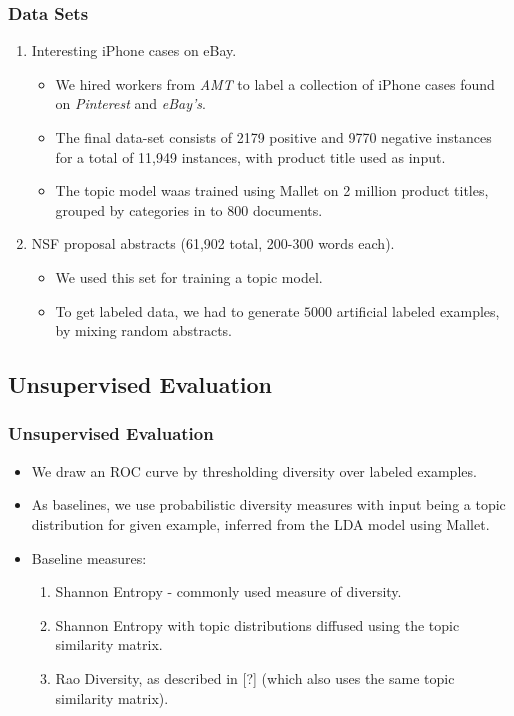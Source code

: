 \documentclass{beamer}
\begin{document}
\begin{frame}
\frametitle{Data Sets}
\begin{enumerate}
\item Interesting iPhone cases on eBay.
  \begin{itemize}
  \item We hired workers from {\em AMT} to label a collection
of iPhone cases found on {\em Pinterest} and {\em
  eBay's}.
\item The final data-set consists of 2179 positive and 9770 negative instances for
a total of 11,949 instances, with product title used as input. 
\item The topic model waas trained using Mallet on 2 million product
  titles, grouped by categories in to 800 documents.
\end{itemize}
\item NSF proposal abstracts (61,902 total, 200-300 words each).
\begin{itemize}
\item We used this set 
for training a topic model.
\item To get labeled data, we had to generate $5000$ artificial
  labeled examples, by mixing random abstracts. 
\end{itemize}
\end{enumerate}
\end{frame}

\subsection{Unsupervised Evaluation}

\begin{frame}
\frametitle{Unsupervised Evaluation}
\begin{itemize}
\item We draw an ROC curve by thresholding diversity
  over labeled examples. 
\item As baselines, we use probabilistic diversity
  measures with input being a topic distribution for  given example,
  inferred from the LDA model using Mallet.
\item Baseline measures:
\begin{enumerate}
\item Shannon Entropy - commonly used measure of diversity.
\item Shannon Entropy with topic distributions diffused using the topic
  similarity matrix. 
\item Rao Diversity, as described in [?] (which also uses the same
  topic similarity matrix). 
\end{enumerate}
\end{itemize}
\end{frame}
\end{document}
